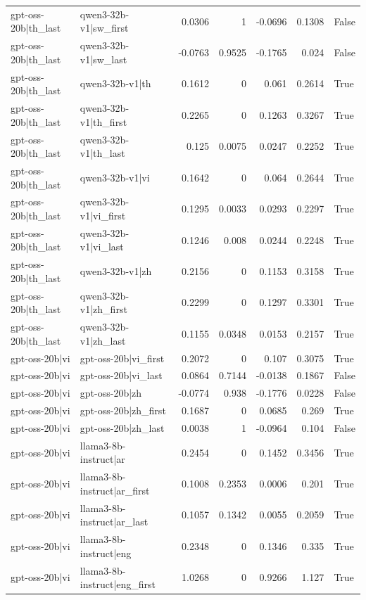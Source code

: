 \begin{table}
\begin{tabular}{l l r r r r l}
gpt-oss-20b|th_last & qwen3-32b-v1|sw_first & 0.0306 & 1 & -0.0696 & 0.1308 & False \\
gpt-oss-20b|th_last & qwen3-32b-v1|sw_last & -0.0763 & 0.9525 & -0.1765 & 0.024 & False \\
gpt-oss-20b|th_last & qwen3-32b-v1|th & 0.1612 & 0 & 0.061 & 0.2614 & True \\
gpt-oss-20b|th_last & qwen3-32b-v1|th_first & 0.2265 & 0 & 0.1263 & 0.3267 & True \\
gpt-oss-20b|th_last & qwen3-32b-v1|th_last & 0.125 & 0.0075 & 0.0247 & 0.2252 & True \\
gpt-oss-20b|th_last & qwen3-32b-v1|vi & 0.1642 & 0 & 0.064 & 0.2644 & True \\
gpt-oss-20b|th_last & qwen3-32b-v1|vi_first & 0.1295 & 0.0033 & 0.0293 & 0.2297 & True \\
gpt-oss-20b|th_last & qwen3-32b-v1|vi_last & 0.1246 & 0.008 & 0.0244 & 0.2248 & True \\
gpt-oss-20b|th_last & qwen3-32b-v1|zh & 0.2156 & 0 & 0.1153 & 0.3158 & True \\
gpt-oss-20b|th_last & qwen3-32b-v1|zh_first & 0.2299 & 0 & 0.1297 & 0.3301 & True \\
gpt-oss-20b|th_last & qwen3-32b-v1|zh_last & 0.1155 & 0.0348 & 0.0153 & 0.2157 & True \\
gpt-oss-20b|vi & gpt-oss-20b|vi_first & 0.2072 & 0 & 0.107 & 0.3075 & True \\
gpt-oss-20b|vi & gpt-oss-20b|vi_last & 0.0864 & 0.7144 & -0.0138 & 0.1867 & False \\
gpt-oss-20b|vi & gpt-oss-20b|zh & -0.0774 & 0.938 & -0.1776 & 0.0228 & False \\
gpt-oss-20b|vi & gpt-oss-20b|zh_first & 0.1687 & 0 & 0.0685 & 0.269 & True \\
gpt-oss-20b|vi & gpt-oss-20b|zh_last & 0.0038 & 1 & -0.0964 & 0.104 & False \\
gpt-oss-20b|vi & llama3-8b-instruct|ar & 0.2454 & 0 & 0.1452 & 0.3456 & True \\
gpt-oss-20b|vi & llama3-8b-instruct|ar_first & 0.1008 & 0.2353 & 0.0006 & 0.201 & True \\
gpt-oss-20b|vi & llama3-8b-instruct|ar_last & 0.1057 & 0.1342 & 0.0055 & 0.2059 & True \\
gpt-oss-20b|vi & llama3-8b-instruct|eng & 0.2348 & 0 & 0.1346 & 0.335 & True \\
gpt-oss-20b|vi & llama3-8b-instruct|eng_first & 1.0268 & 0 & 0.9266 & 1.127 & True \\

\end{tabular}
\end{table}
